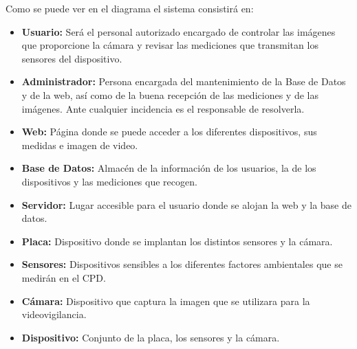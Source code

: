 \begin{figure}[H]
{}
\end{figure}

Como se puede ver en el diagrama el sistema consistirá en:
\begin{itemize}
	\item \textbf{Usuario:} Será el personal autorizado encargado de controlar las imágenes que proporcione la cámara y revisar las mediciones que transmitan los sensores del dispositivo.
	\item \textbf{Administrador:} Persona encargada del mantenimiento de la Base de Datos y de la web, así como de la buena recepción de las mediciones y de las imágenes. Ante cualquier incidencia es el responsable de resolverla.
	\item \textbf{Web:} Página donde se puede acceder a los diferentes dispositivos, sus medidas e imagen de video.
	\item \textbf{Base de Datos:} Almacén de la información de los usuarios, la de los dispositivos y las mediciones que recogen.
	\item \textbf{Servidor:} Lugar accesible para el usuario donde se alojan la web y la base de datos.
	\item \textbf{Placa:} Dispositivo donde se implantan los distintos sensores y la cámara.
	\item \textbf{Sensores:} Dispositivos sensibles a los diferentes factores ambientales que se medirán en el CPD.
	\item \textbf{Cámara:} Dispositivo que captura la imagen que se utilizara para la videovigilancia.
	\item \textbf{Dispositivo:} Conjunto de la placa, los sensores y la cámara.
\end{itemize}

